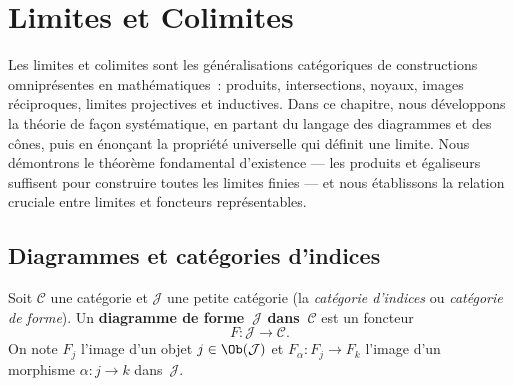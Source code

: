 

\chapter{Limites et Colimites}\label{ch:limites-colimites}
\minitoc

\vspace{1em}

Les limites et colimites sont les généralisations catégoriques de
constructions omniprésentes en mathématiques~: produits, intersections,
noyaux, images réciproques, limites projectives et inductives.
Dans ce chapitre, nous développons la théorie de façon systématique,
en partant du langage des diagrammes et des cônes, puis en énonçant
la propriété universelle qui définit une limite. Nous démontrons
le théorème fondamental d'existence --- les produits et égaliseurs
suffisent pour construire toutes les limites finies --- et nous
établissons la relation cruciale entre limites et foncteurs
représentables.


\section{Diagrammes et catégories d'indices}\label{sec:diagrammes}

\begin{definition}[Diagramme]\label{def:diagramme}
Soit $\mathcal{C}$ une catégorie et $\mathcal{J}$ une petite catégorie
(la \emph{catégorie d'indices} ou \emph{catégorie de forme}).
Un \textbf{diagramme de forme~$\mathcal{J}$ dans~$\mathcal{C}$} est un foncteur
\[
    F \colon \mathcal{J} \longrightarrow \mathcal{C}.
\]
On note $F_j$ l'image d'un objet $j \in \Ob(\mathcal{J})$
et $F_\alpha \colon F_j \to F_k$ l'image d'un morphisme
$\alpha \colon j \to k$ dans~$\mathcal{J}$.
\end{definition}

